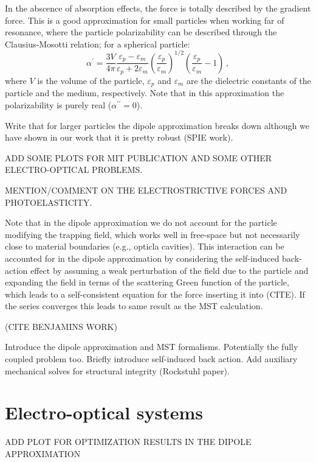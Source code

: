In the abscence of absorption effects, the force is totally described 
by the gradient force. This is a good approximation for small particles
when working far of resonance, where the particle polarizability can be 
described through the Clausius-Mosotti relation; for a spherical particle:
\begin{equation}
    \alpha^{\prime}=\frac{3 V}{4 \pi} \frac{\varepsilon_p-\varepsilon_m}{\varepsilon_p+2 \varepsilon_m} \left(\frac{\varepsilon_p}{\varepsilon_m}\right)^{1 / 2} \left(\frac{\varepsilon_p}{\varepsilon_m}-1\right)\,,
\end{equation}
where $V$ is the volume of the particle, $\varepsilon_p$ and $\varepsilon_m$ are the
dielectric constants of the particle and the medium, respectively. Note that in this 
approximation the polarizability is purely real ($\alpha^{\prime \prime} = 0$).

Write that for larger particles the dipole approximation breaks down
although we have shown in our work that it is pretty robust (SPIE work).

ADD SOME PLOTS FOR MIT PUBLICATION AND SOME OTHER ELECTRO-OPTICAL PROBLEMS.

MENTION/COMMENT ON THE ELECTROSTRICTIVE FORCES AND PHOTOELASTICITY.

Note that in the dipole approximation we do not account for the particle modifying
the trapping field, which works well in free-space but not necessarily close to material
boundaries (e.g., opticla cavities). This interaction can be accounted for in the dipole
approximation by considering the self-induced back-action effect by assuming a weak
perturbation of the field due to the particle and expanding the field in terms of 
the scattering Green function of the particle, which leads to a self-consistent
equation for the force inserting it into (CITE). If the series converges this leads 
to same result as the MST calculation. 

(CITE BENJAMINS WORK)

Introduce the dipole approximation and MST formalisms. Potentially the fully coupled problem too.
Briefly introduce self-induced back action.
Add auxiliary mechanical solves for structural integrity (Rockstuhl paper).

\section{Electro-optical systems~\cite{ownpub4}}

ADD PLOT FOR OPTIMIZATION RESULTS IN THE DIPOLE APPROXIMATION

